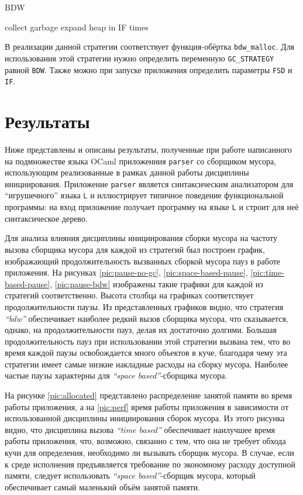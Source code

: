 \begin{algorithm}[hbt]
\caption{BDW}
\label{BDW-algo1}
\begin{algorithmic}[1]
        \State collect garbage
    \Else 
        \State expand heap in IF times
    \EndIf
\EndIf
\end{algorithmic}
\end{algorithm}

В реализации данной стратегии соответствует функция-обёртка \texttt{bdw\_malloc}. Для использования
этой стратегии нужно определить переменную \texttt{GC\_STRATEGY} равной \texttt{BDW}. Также можно при запуске приложения
определить параметры \texttt{FSD} и \texttt{IF}.

\section{Результаты}

Ниже представлены и описаны результаты, полученные при работе написанного на 
подмножестве языка OCaml приложениия \texttt{parser} со сборщиком мусора,
использующим реализованные в рамках данной работы дисциплины инициирования.
Приложение \texttt{parser} является
синтаксическим анализатором для ``игрушечного'' языка \texttt{L} и иллюстрирует типичное
поведение функциональной программы: на вход приложение получает программу на языке 
\texttt{L}
и строит для неё синтаксическое дерево. 


Для анализа влияния дисциплины инициирования сборки мусора на частоту вызова сборщика
мусора для каждой из стратегий был построен график, изображающий продолжительность 
вызванных сборкой мусора пауз в 
работе приложения. На рисунках \ref{pic:pause-no-gc},
\ref{pic:space-based-pause}, \ref{pic:time-based-pause}, \ref{pic:pause-bdw} 
изображены такие графики для каждой из стратегий соответственно. Высота столбца на графиках
соответствует продолжительности паузы. Из представленных графиков видно, что
стратегия \emph{``bdw''} обеспечивает наиболее редкий вызов сборщика мусора, что сказывается,
однако, на продолжительности пауз, делая их достаточно долгими. 
Большая продолжительность пауз при использовании этой стратегии вызвана
тем, что во время каждой паузы освобождается много объектов в куче,
благодаря чему эта стратегии имеет самые низкие накладные расходы на сборку
мусора. Наиболее частые паузы характерны для \emph{``space based''}-сборщика мусора. 

На рисунке \ref{pic:allocated} представлено распределение занятой памяти во время работы 
приложения, а на \ref{pic:perf} время работы приложения в зависимости
от использованной дисциплины инициирования сборок мусора. Из этого рисунка видно, что дисциплина вызова 
\emph{``time based''} обеспечивает наилучшее время работы приложения, что, возможно,
связанно с тем, что она не требует обхода кучи для определения, необходимо 
ли вызывать сборщик мусора. В случае, если к среде исполнения предъявляется требование
по экономному расходу доступной памяти, следует использовать \emph{``space based''}-сборщик
мусора, который обеспечивает самый маленький объём занятой памяти.

